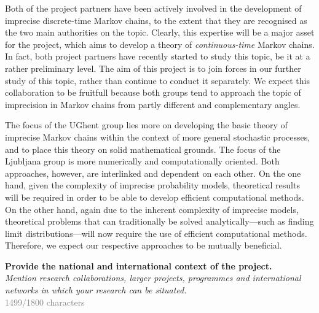 \documentclass[11pt,dvipsnames,usenames,a4paper]{article}
\begin{document}
Both of the project partners have been actively involved in the development of imprecise discrete-time Markov chains, to the extent that they are recognised as the two main authorities on the topic. 
Clearly, this expertise will be a major asset for the project, which aims to develop a theory of \emph{continuous-time} Markov chains. In fact, both project partners have recently started to study this topic, be it at a rather preliminary level. The aim of this project is to join forces in our further study of this topic, rather than continue to conduct it separately. We expect this collaboration to be fruitfull because both groups tend to approach the topic of imprecision in Markov chains from partly different and complementary angles.

The focus of the UGhent group lies more on developing the basic theory of imprecise Markov chains within the context of more general stochastic processes, and to place this theory on solid mathematical grounds. 
The focus of the Ljubljana group is more numerically and computationally oriented. 
Both approaches, however, are interlinked and dependent on each other. 
On the one hand, given the complexity of imprecise probability models, theoretical results will be required in order to be able to develop efficient computational methods. 
On the other hand, again due to the inherent complexity of imprecise models, theoretical problems that can traditionally be solved analytically---such as finding limit distributions---will now require the use of efficient computational methods. 
Therefore, we expect our respective approaches to be mutually beneficial.



\newpage

\textbf{Provide the national and international context of the project.}\\
\textit{Mention research collaborations, larger projects, programmes and international networks in which your research can be situated.}\\
\textcolor{Gray}{1499/1800 characters}
\end{document}
